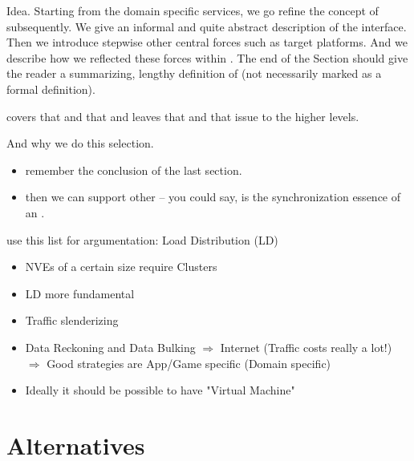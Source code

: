 Idea. Starting from the domain specific services, we go refine the
concept of \SYNEIGHT subsequently. We give an informal and quite
abstract description of the interface. Then we introduce stepwise
other central forces such as target platforms. And we describe how we
reflected these forces within \SYNEIGHT. The end of the Section should
give the reader a summarizing, lengthy definition of \SYNEIGHT (not
necessarily marked as a formal definition).


\SYNEIGHT covers that and that and leaves that and that issue to the
higher levels.

And why we do this selection. 
\begin{itemize}
\item remember the conclusion of the last section.
\item then we can support other \NVES -- you could say, \SYNEIGHT is
the synchronization essence of an \NVE.
\end{itemize}


use this list for argumentation: Load Distribution (LD)
\begin{itemize}
        \item NVEs of a certain size require Clusters
        \item LD more fundamental
        \item Traffic slenderizing
        \item Data Reckoning and Data Bulking
              $\Rightarrow$ Internet (Traffic costs
              really a lot!)\\
              $\Rightarrow$ Good strategies are App/Game
              specific (Domain specific)
	\item Ideally it should be possible to have "Virtual Machine"
\end{itemize}

\section{Alternatives}

